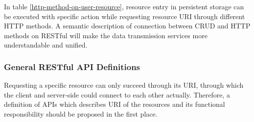 In table \ref{http-method-on-user-resource}, resource entry in persistent storage can be executed with specific action while requesting resource URI through different HTTP methods. A semantic description of connection between \gls{CRUD} and HTTP methods on RESTful will make the data transmission services more understandable and unified.

\subsubsection{ General RESTful API Definitions }

Requesting a specific resource can only succeed through its \gls{URI}, through which the client and server-side could connect to each other actually. Therefore, a definition of APIs which describes \gls{URI} of the resources and its functional responsibility should be proposed in the first place.


